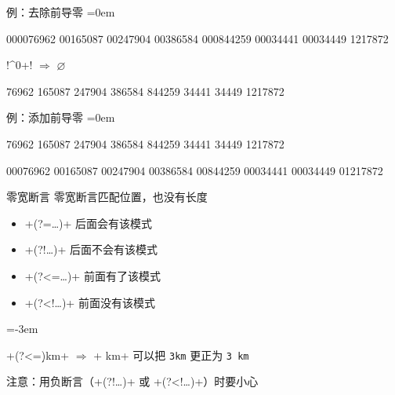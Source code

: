 \documentclass{beamer}
\makeatletter
\def\mymikudark#1{{\color{beamer@blendedblue}#1}}
\def\mymikuribbon#1{{\color{mikuribbon}#1}}
\newcommand{\txt}[1]{\mymikudark{\texttt{#1}}}
\def\replace{{\color{black} $\Rightarrow$ }}
\def\nothing{\mymikuribbon{$\varnothing$}}
\def\source{Source}
\def\target{Target}
\newenvironment{igsimple}%
	{\begin{description*}\leftskip=-3em\relax\item[例：\kern-1ex]}%
	{\end{description*}}
\makeatother
\begin{document}
\begin{frame}[fragile]{例：去除前导零}
	\parindent=0em
	\hbox{}\hfill
	\begin{minipage}[c]{12.5ex}
		\begin{YVerb}[label=\source]
			000076962
			00165087
			00247904
			00386584
			000844259
			00034441
			00034449
			1217872
		\end{YVerb}
	\end{minipage}%
	\hfill
	\begin{minipage}[c]{11ex}
		!^0+! \replace \nothing
	\end{minipage}%
	\hfill
	\begin{minipage}[c]{10.5ex}
		\begin{YVerb}[label=\target]
			76962
			165087
			247904
			386584
			844259
			34441
			34449
			1217872
		\end{YVerb}
	\end{minipage}
	\hfill\hbox{}\par
\end{frame}

\begin{frame}[fragile]{例：添加前导零}
	\parindent=0em
	\hbox{}\hfill
	\begin{minipage}[c]{10.5ex}
		\begin{YVerb}[label=\source]
			76962
			165087
			247904
			386584
			844259
			34441
			34449
			1217872
		\end{YVerb}
	\end{minipage}%
	\hfill
	\begin{minipage}[c]{28ex}
	\end{minipage}%
	\hfill
	\begin{minipage}[c]{11.5ex}
		\begin{YVerb}[label=\target]
			00076962
			00165087
			00247904
			00386584
			00844259
			00034441
			00034449
			01217872
		\end{YVerb}
	\end{minipage}
	\hfill\hbox{}\par
\end{frame}

\begin{frame}[fragile]{零宽断言}
	\UndefineShortVerb{\!}
	\DefineShortVerb{\+}
	零宽断言匹配位置，也没有长度
	\begin{itemize}
		\item +(?=…)+ 后面会有该模式
		\item +(?!…)+ 后面不会有该模式
		\item +(?<=…)+ 前面有了该模式
		\item +(?<!…)+ 前面没有该模式
	\end{itemize}
	\begin{igsimple}
		+(?<=\d)km\>+ \replace + km+ 可以把 \txt{3km} 更正为 \txt{3 km}
	\end{igsimple}
	注意：用负断言（+(?!…)+ 或 +(?<!…)+）时要小心
	\UndefineShortVerb{\+}
	\DefineShortVerb{\!}
\end{frame}
\end{document}

